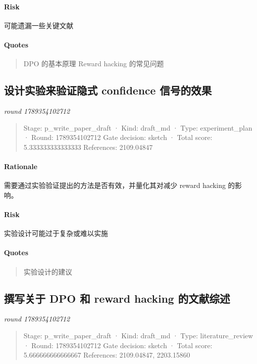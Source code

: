 \documentclass{article}
\begin{document}
\paragraph{Risk}

可能遗漏一些关键文献

\paragraph{Quotes}
\begin{quote}
DPO 的基本原理
Reward hacking 的常见问题
\end{quote}

\subsection{设计实验来验证隐式 confidence 信号的效果}
\textit{round 1789354102712}\\
\begin{quote}
Stage: p\_write\_paper\_draft  ·  Kind: draft\_md  ·  Type: experiment\_plan  ·  Round: 1789354102712
Gate decision: sketch  ·  Total score: 5.333333333333333
References: 2109.04847
\end{quote}

\paragraph{Rationale}

需要通过实验验证提出的方法是否有效，并量化其对减少 reward hacking 的影响。

\paragraph{Risk}

实验设计可能过于复杂或难以实施

\paragraph{Quotes}
\begin{quote}
实验设计的建议
\end{quote}

\subsection{撰写关于 DPO 和 reward hacking 的文献综述}
\textit{round 1789354102712}\\
\begin{quote}
Stage: p\_write\_paper\_draft  ·  Kind: draft\_md  ·  Type: literature\_review  ·  Round: 1789354102712
Gate decision: sketch  ·  Total score: 5.666666666666667
References: 2109.04847, 2203.15860
\end{quote}
\end{document}
